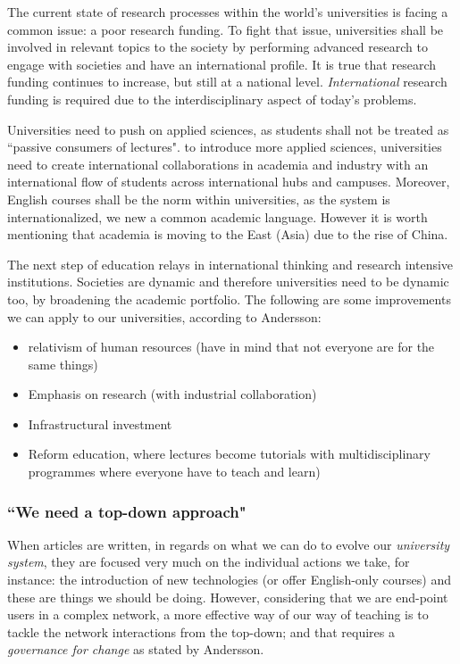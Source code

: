 \documentclass[11pt,a4paper]{article}
\begin{document}
The current state of research processes within the world's universities is facing a common issue: a poor research funding. To fight that issue, universities shall be involved in relevant topics to the society by performing advanced research to engage with societies and have an international profile. It is true that research funding continues to increase, but still at a national level. \emph{International} research funding is required due to the interdisciplinary aspect of today's problems.

Universities need to push on applied sciences, as students shall not be treated as ``passive consumers of lectures". to introduce more applied sciences, universities need to create international collaborations in academia and industry with an international flow of students across international hubs and campuses. Moreover, English courses shall be the norm within universities, as the system is internationalized, we new a common academic language. However it is worth mentioning that academia is moving to the East (Asia) due to the rise of China.

The next step of education relays in international thinking and research intensive institutions. Societies are dynamic and therefore universities need to be dynamic too, by broadening the academic portfolio. The following are some improvements we can apply to our universities, according to Andersson:

\begin{itemize}
	\item{relativism of human resources (have in mind that not everyone are for the same things)}
	\item{Emphasis on research (with industrial collaboration)}
	\item{Infrastructural investment}
	\item{Reform education, where lectures become tutorials with multidisciplinary programmes where everyone have to teach and learn)}
\end{itemize}

\subsubsection*{``We need a top-down approach"}
When articles are written, in regards on what we can do to evolve our \emph{university system}, they are focused very much on the individual actions we take, for instance: the introduction of new technologies (or offer English-only courses) and these are things we should be doing. However, considering that we are end-point users in a complex network, a more effective way of our way of teaching is to tackle the network interactions from the top-down; and that requires a \emph{governance for change} as stated by Andersson.
\end{document}
